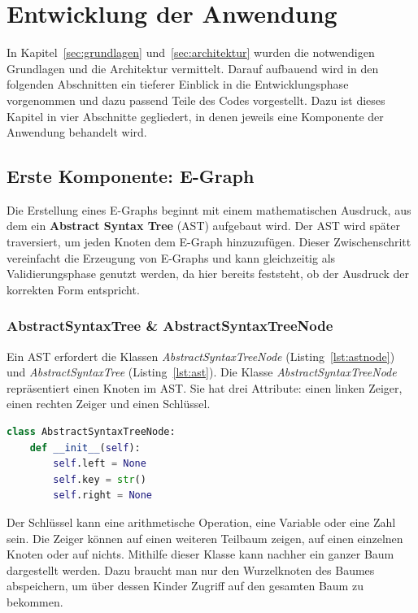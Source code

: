 \section{Entwicklung der Anwendung}\label{sec:entwicklung}

In Kapitel~\ref{sec:grundlagen} und~\ref{sec:architektur} wurden die notwendigen Grundlagen und die Architektur vermittelt.
Darauf aufbauend wird in den folgenden Abschnitten ein tieferer Einblick in die Entwicklungsphase vorgenommen und dazu passend Teile des Codes vorgestellt.
Dazu ist dieses Kapitel in vier Abschnitte gegliedert, in denen jeweils eine Komponente der Anwendung behandelt wird.

\subsection{Erste Komponente: E-Graph}

Die Erstellung eines E-Graphs beginnt mit einem mathematischen Ausdruck, aus dem ein \textbf{Abstract Syntax Tree} (AST) aufgebaut wird.
Der AST wird später traversiert, um jeden Knoten dem E-Graph hinzuzufügen. Dieser Zwischenschritt vereinfacht die Erzeugung von E-Graphs und
kann gleichzeitig als Validierungsphase genutzt werden, da hier bereits feststeht, ob der Ausdruck der korrekten Form entspricht.

\subsubsection{AbstractSyntaxTree \& AbstractSyntaxTreeNode}

Ein AST erfordert die Klassen \textit{AbstractSyntaxTreeNode} (Listing~\ref{lst:astnode}) und 
\textit{AbstractSyntaxTree} (Listing~\ref{lst:ast}). Die Klasse \textit{AbstractSyntaxTreeNode} repräsentiert
einen Knoten im AST. Sie hat drei Attribute: einen linken Zeiger, einen rechten Zeiger und einen Schlüssel.

\begin{lstlisting}[language=Python, caption=Klasse \textit{AbstractSyntaxTreeNode}, label={lst:astnode}]
class AbstractSyntaxTreeNode:
    def __init__(self):
        self.left = None
        self.key = str()
        self.right = None
\end{lstlisting}

Der Schlüssel kann eine arithmetische Operation, eine Variable oder eine Zahl sein. Die Zeiger können auf einen weiteren Teilbaum zeigen, auf einen einzelnen Knoten
oder auf nichts. Mithilfe dieser Klasse kann nachher ein ganzer Baum dargestellt werden. Dazu braucht man nur den Wurzelknoten des Baumes abspeichern, um über dessen Kinder
Zugriff auf den gesamten Baum zu bekommen. 

